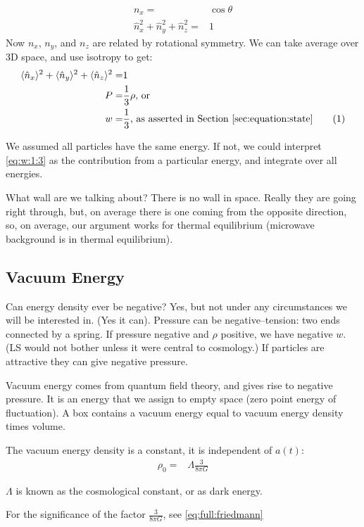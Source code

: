 \documentclass[]{article}
\newcommand\numberthis{\addtocounter{equation}{1}\tag{\theequation}}
\begin{document}
\begin{align*}
	n_x =& \cos{\theta}\\
	\hat{n}_x^2 +  \hat{n}_y^2 +  \hat{n}_z^2=&1
\end{align*}
Now $n_x$, $n_y$, and $n_z$ are related by rotational symmetry. We can take average over 3D space, and use isotropy to get:
\begin{align*}
		\langle \hat{n}_x\rangle^2 + \langle \hat{n}_y\rangle^2 + \langle \hat{n}_z\rangle^2=&1\\
	P =&\frac{1}{3} \rho \text{, or}\\
	w =& \frac{1}{3}\text{, as asserted in Section \ref{sec:equation:state}}\numberthis \label{eq:w:1:3}
\end{align*}

We assumed all particles have the same energy. If not, we could interpret \eqref{eq:w:1:3} as the contribution from a particular energy, and integrate over all energies.

What wall are we talking about? There is no wall in space. Really they are going right through, but, on average there is one coming from the opposite direction, so, on average, our argument works for thermal equilibrium (microwave background is in thermal equilibrium).

\subsection{Vacuum Energy}
Can energy density ever be negative? Yes, but not under any circumstances we will be interested in. (Yes it can). Pressure can be negative--tension: two ends connected by a spring. If pressure negative and $\rho$ positive, we have negative $w$. (LS would not bother unless it were central to cosmology.) If particles are attractive they can give negative pressure.

Vacuum energy comes from quantum field theory, and gives rise to negative pressure. It is an energy that we assign to empty space (zero point energy of fluctuation). A box contains a vacuum energy equal to vacuum energy density times volume.

The vacuum energy density is a constant, it is independent of $a(t)$:
\begin{align*}
	\rho_0 =& \Lambda \frac{3}{8 \pi G}
\end{align*}

$\Lambda$ is known as the cosmological constant, or as dark energy.
 
For the significance of the factor $\frac{3}{8 \pi G}$, see \eqref{eq:full:friedmann}
\end{document}
